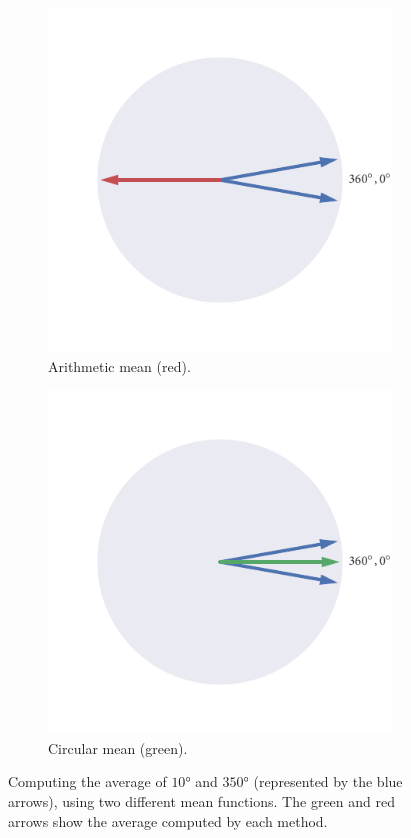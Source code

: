 \begin{figure}
	\begin{subfigure}[b]{0.5\textwidth}
		\includegraphics{arith_mean.pdf}
		\caption{Arithmetic mean (red).}
		\label{subfig:arith_mean}
	\end{subfigure}%
	\begin{subfigure}[b]{0.5\textwidth}
		\includegraphics{circ_mean.pdf}
		\caption{Circular mean (green).}
		\label{subfig:circ_mean}
	\end{subfigure}
    \caption{Computing the average of $\ang{10}$ and $\ang{350}$ (represented
      by the blue arrows), using two different mean functions. The green and red
      arrows show the average computed by each method.}
	\label{fig:visualise_mean}
\end{figure}

